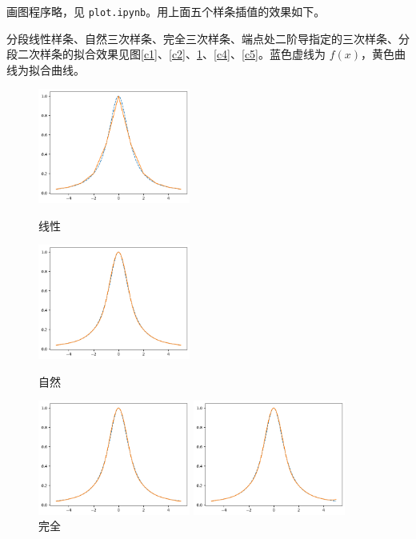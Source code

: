 \documentclass{ctexart}
\begin{document}
画图程序略，见 \verb|plot.ipynb|。用上面五个样条插值的效果如下。

分段线性样条、自然三次样条、完全三次样条、端点处二阶导指定的三次样条、分段二次样条的拟合效果见图\ref{c1}、\ref{c2}、\ref{c3}、\ref{c4}、\ref{c5}。蓝色虚线为 $f(x)$，黄色曲线为拟合曲线。

\begin{figure}[htbp]
\centering
\begin{minipage}{5cm}
    \centering
    \includegraphics[width=5cm]{c1.png}
    \caption{线性}
    \label{c1}
\end{minipage}
\qquad
\begin{minipage}{5cm}
    \centering
    \includegraphics[width=5cm]{c3.png}
    \caption{自然}
    \label{c2}
\end{minipage}
\begin{minipage}{5cm}
    \centering
    \includegraphics[width=5cm]{c2.png}
    \caption{完全}
    \label{c3}
\end{minipage}
\qquad
\begin{minipage}{5cm}
    \centering
    \includegraphics[width=5cm]{c4.png}

\end{minipage}
\end{figure}
\end{document}
